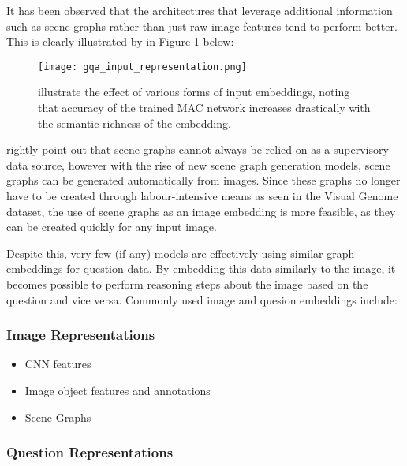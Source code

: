 It has been observed that the architectures that leverage additional information such as scene graphs rather than just raw image features tend to perform better. This is clearly illustrated by \citeauthor{hudson2019gqa_arxiv} in Figure \ref{fig:gqa_input_representation} below:

\begin{figure}[H]
    \centering
    \texttt{[image: gqa\_input\_representation.png]}
    \caption{\citeauthor{hudson2019gqa_arxiv} illustrate the effect of various forms of input embeddings, noting that accuracy of the trained MAC network \cite{hudson2018compositional} increases drastically with the semantic richness of the embedding.}
    \label{fig:gqa_input_representation}
\end{figure}

\citeauthor{hudson2018compositional} rightly point out that scene graphs cannot always be relied on as a supervisory data source, however with the rise of new scene graph generation models, scene graphs can be generated automatically from images. Since these graphs no longer have to be created through labour-intensive means as seen in the Visual Genome dataset, the use of scene graphs as an image embedding is more feasible, as they can be created quickly for any input image.

\vspace{\baselineskip}

Despite this, very few (if any) models are effectively using similar graph embeddings for question data. By embedding this data similarly to the image, it becomes possible to perform reasoning steps about the image based on the question and vice versa. Commonly used image and quesion embeddings include:

\subsubsection*{Image Representations}

\begin{itemize}
    \item CNN features
    \item Image object features and annotations
    \item Scene Graphs
\end{itemize}

\subsubsection*{Question Representations}

